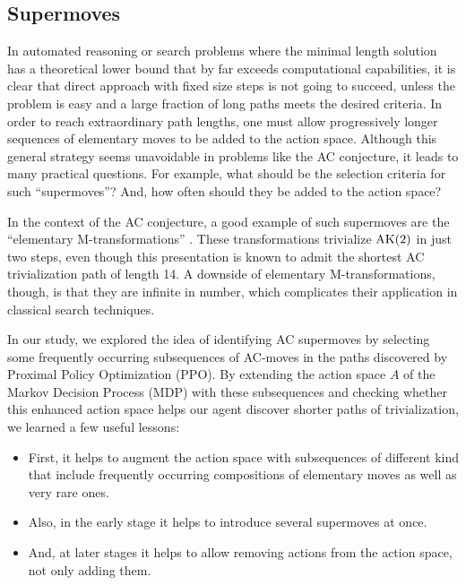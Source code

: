 \subsection{Supermoves}

In automated reasoning or search problems where the minimal length solution has a theoretical lower bound that by far exceeds computational capabilities, it is clear that direct approach with fixed size steps is not going to succeed, unless the problem is easy and a large fraction of long paths meets the desired criteria. In order to reach extraordinary path lengths, one must allow progressively longer sequences of elementary moves to be added to the action space. Although this general strategy seems unavoidable in problems like the AC conjecture, it leads to many practical questions. For example, what should be the selection criteria for such ``supermoves''? And, how often should they be added to the action space?

In the context of the AC conjecture, a good example of such supermoves are the ``elementary M-transformations'' \cite{BurnsI, BurnsII}. These transformations trivialize $\text{AK}(2)$ in just two steps, even though this presentation is known to admit the shortest AC trivialization path of length 14. A downside of elementary M-transformations, though, is that they are infinite in number, which complicates their application in classical search techniques.

In our study, we explored the idea of identifying AC supermoves by selecting some frequently occurring subsequences of AC-moves in the paths discovered by Proximal Policy Optimization (PPO). By extending the action space $A$ of the Markov Decision Process (MDP) with these subsequences and checking whether this enhanced action space helps our agent discover shorter paths of trivialization, we learned a few useful lessons:

\begin{itemize}

	\item First, it helps to augment the action space with subsequences of different kind that include frequently occurring compositions of elementary moves as well as very rare ones.

	\item Also, in the early stage it helps to introduce several supermoves at once.

	\item And, at later stages it helps to allow removing actions from the action space, not only adding them.
\end{itemize}

